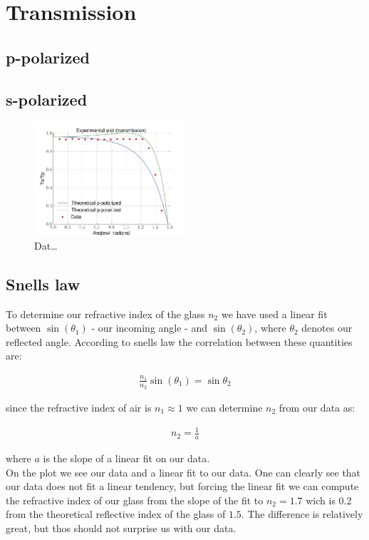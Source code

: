 \section{Transmission}
\subsection{p-polarized}
\subsection{s-polarized}
\begin{figure}[h]
    \centering
    \includegraphics[width=0.5\textwidth]{transmission}
    \caption{Dat\ldots}
    \label{fig:transmission}
\end{figure}

\subsection{Snells law}

To determine our refractive index of the glass $n_2$ we have used a linear fit between $\sin(\theta_1)$ - our incoming angle - and $\sin(\theta_2)$, where $\theta_2$ denotes our reflected angle. According to snells law the correlation between these quantities are:

\begin{align}
\frac{n_1}{n_2}\sin(\theta_1)=\sin{\theta_2}
\end{align}

since the refractive index of air is $n_1 \approx 1$ we can determine $n_2$ from our data as:

\begin{align}
n_2=\frac{1}{a}
\end{align}

where $a$ is the slope of a linear fit on our data. \\

On the plot we see our data and a linear fit to our data. One can clearly see that our data does not fit a linear tendency, but forcing the linear fit we can compute the refractive index of our glass from the slope of the fit to $n_2=1.7$ wich is 0.2 from the theoretical reflective index of the glass of $1.5$. The difference is relatively great, but thos should not surprise us with our data. 

